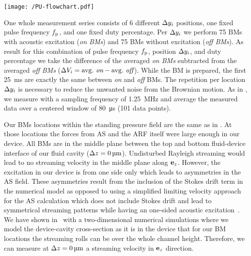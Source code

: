 \begin{figure*}[tbp]
  \centering
  \texttt{[image: /PU-flowchart.pdf]}
  \caption{Process diagram for one measurement cycle. The gray rectangles 
    represent the processes during the build up measurement (BM). During this 
    time the particle is free floating (orange area). All others process steps 
    are before or after a BM. The timestamps in the hatched rounded rectangles 
    represent the times when the process attached to them is executed. One 
    measurement cycle takes about \SI{2}{\s} to be executed. The BM itself is 
  less than \SI{100}{\ms}.}\label{fig:PU-flowchart}
\end{figure*}

One whole measurement series consists of 6 different $\Delta y_{i}$ positions, one 
fixed pulse frequency $f_{\mathrm{p}}$, and one fixed duty percentage. Per $\Delta y_{i}$ we 
perform 75 BMs with acoustic excitation (\emph{on BMs}) and 75 BMs without 
excitation (\emph{off BMs}). As result for this combination of pulse frequency 
$f_{\mathrm{p}}$, position $\Delta y_{i}$, and duty percentage we take the difference of the 
averaged \emph{on BMs} subtracted from the averaged \emph{off BMs} ($\Delta V_{i}= 
{\mathrm{avg.~\emph{on}}} - {\mathrm{avg.~\emph{off}}}$). While the BM is 
prepared, the first \SI{25}{\ms} are exactly the same between \emph{on} and 
\emph{off} BMs. The repetition per location $\Delta y_{i}$ is necessary to reduce 
the unwanted noise from the Brownian motion. As in \cite{Goering2021}, we 
measure with a sampling frequency of \SI{1.25}{\mega\hertz} and average the 
measured data over a centered window of \SI{80}{\us} (101 data points).

Our BMs locations within the standing pressure field are the same as in 
\cite{Goering2021}. At those locations the forces from AS and the ARF itself 
were large enough in our device. All BMs are in the middle plane between the 
top and bottom fluid-device interface of our fluid cavity ($\Delta z = 
\SI{0}{\si{\micro\meter}}$). Undisturbed Rayleigh streaming would lead to no streaming 
velocity in the middle plane along $\vb{e}_{z}$. However, the excitation in our device 
is from one side only which leads to asymmetries in the AS field. These 
asymmetries result from the inclusion of the Stokes drift term in the numerical 
model as opposed to using a simplified limiting velocity approach for the AS 
calculation which does not include Stokes drift and lead to symmetrical 
streaming patterns while having an one-sided acoustic 
excitation~\cite{Hahn2016}. We have shown in~\cite{Goering2021} with a 
two-dimensional numerical simulations where we model the device-cavity 
cross-section as it is in the device that for our BM locations the streaming 
rolls can be over the whole channel height. Therefore, we can measure at $\Delta z 
= \SI{0}{\si{\micro\meter}}$ a streaming velocity in $\vb{e}_{z}$ direction.

